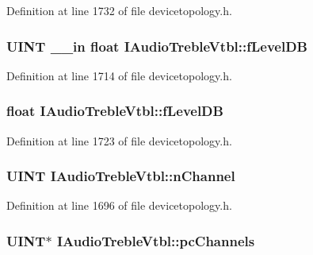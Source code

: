 Definition at line 1732 of file devicetopology.\+h.

\subsubsection[{\texorpdfstring{f\+Level\+DB}{fLevelDB}}]{ {\bf U\+I\+NT} {\bf \+\_\+\+\_\+in} float I\+Audio\+Treble\+Vtbl\+::f\+Level\+DB}\hypertarget{struct_i_audio_treble_vtbl_afb44bdcaae9981b394534667285b775b}{}\label{struct_i_audio_treble_vtbl_afb44bdcaae9981b394534667285b775b}


Definition at line 1714 of file devicetopology.\+h.

\subsubsection[{\texorpdfstring{f\+Level\+DB}{fLevelDB}}]{ float I\+Audio\+Treble\+Vtbl\+::f\+Level\+DB}\hypertarget{struct_i_audio_treble_vtbl_a184ef9feede77235fa06408c1af7b185}{}\label{struct_i_audio_treble_vtbl_a184ef9feede77235fa06408c1af7b185}


Definition at line 1723 of file devicetopology.\+h.

\subsubsection[{\texorpdfstring{n\+Channel}{nChannel}}]{ {\bf U\+I\+NT} I\+Audio\+Treble\+Vtbl\+::n\+Channel}\hypertarget{struct_i_audio_treble_vtbl_a18bba5b9633a8c9c406170a947c25195}{}\label{struct_i_audio_treble_vtbl_a18bba5b9633a8c9c406170a947c25195}


Definition at line 1696 of file devicetopology.\+h.

\subsubsection[{\texorpdfstring{pc\+Channels}{pcChannels}}]{ {\bf U\+I\+NT}$\ast$ I\+Audio\+Treble\+Vtbl\+::pc\+Channels}\hypertarget{struct_i_audio_treble_vtbl_a35afde6aef74346a637a8a7249327d2f}{}\label{struct_i_audio_treble_vtbl_a35afde6aef74346a637a8a7249327d2f}


